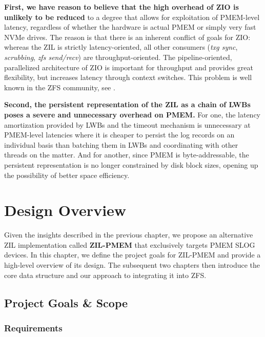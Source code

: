 \documentclass[12pt,a4paper,twoside]{book}
\begin{document}
\textbf{First, we have reason to believe that the high overhead of ZIO is unlikely to be reduced} to a degree that allows for exploitation of PMEM-level latency, regardless of whether the hardware is actual PMEM or simply very fast NVMe drives.
The reason is that there is an inherent conflict of goals for ZIO:
whereas the ZIL is strictly latency-oriented, all other consumers (\textit{txg sync}, \textit{scrubbing}, \textit{zfs send/recv}) are throughput-oriented.
The pipeline-oriented, parallelized architecture of ZIO is important for throughput and provides great flexibility, but increases latency through context switches.
This problem is well known in the ZFS community, see \cite{openzfsZILPerformanceImprovements2020,ZFSSubredditRichardYaoCommentsOnPoorSynchronousWritePerformance,OpenZFSGithubIssueNVMeReadPerformanceZioPipeliningOverheadTimChaseComment}.

\textbf{Second, the persistent representation of the ZIL as a chain of LWBs poses a severe and unnecessary overhead on PMEM.}
For one, the latency amortization provided by LWBs and the timeout mechanism is unnecessary at PMEM-level latencies where it is cheaper to persist the log records on an individual basis than batching them in LWBs and coordinating with other threads on the matter.
And for another, since PMEM is byte-addressable, the persistent representation is no longer constrained by disk block sizes, opening up the possibility of better space efficiency.

\chapter{Design Overview}\label{ch:designoverview}
Given the insights described in the previous chapter, we propose an alternative ZIL implementation called \textbf{ZIL-PMEM} that exclusively targets PMEM SLOG devices.
In this chapter, we define the project goals for ZIL-PMEM and provide a high-level overview of its design.
The subsequent two chapters then introduce the core data structure and our approach to integrating it into ZFS.

\section{Project Goals \& Scope}

\newcommand{\csgoal}[1]{\textbf{#1}}

\subsection{Requirements}\label{sec:requirements}
\end{document}

